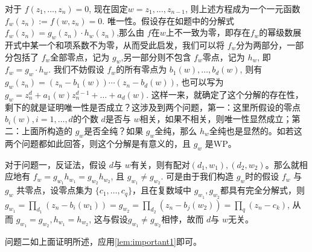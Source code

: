 \documentclass[lang=cn,12pt,fontset=none,a4paper]{beautybook}
\begin{document}
\begin{remark}
   对于 $f(z_1,\dots,z_n)=0$, 现在固定$w=z_1,\dots,z_{n-1}$, 则上述方程成为一个一元函数$f_w (z_n):=f(w,z_n)=0$. 唯一性。假设存在如题中的分解式 $f_w(z_n)=g_w(z_n)\cdot h_w(z_n)$,那么由 $f$在$w$上不一致为零，即存在$f_w$的幂级数展开式中某一个和项系数不为零，从而受此启发，我们可以将 $f_w$分为两部分，一部分包括了 $f_w$全部零点，记为 $g_w$,另一部分则不包含 $f_w$零点，记为 $h_w$, 即 $f_w=g_w\cdot h_w$. 我们不妨假设 $f_w$的所有零点为 $b_1(w),\dots,b_d(w)$, 则有 $g_w(z_n)=(z_n-b_1(w))\cdots (z_n-b_d(w))$, 也可以写为 $g_w=z_n^d+a_1(w) z_n^{d-1}+\dots+a_d(w)$. 这样一来，就确定了这个分解的存在性，剩下的就是证明唯一性是否成立？这涉及到两个问题，第一：这里所假设的零点 $b_i(w),i=1,\dots,d$的个数 $d$是否与 $w$相关，如果不相关，则唯一性显然成立；第二：上面所构造的 $g_w$是否全纯？如果 $g_w$全纯，那么 $h_w$全纯也是显然的。如若这两个问题都如此回答，则这个分解是有意义的，且 $g_w$ 是WP。
   
   对于问题一，反证法，假设 $d$与 $w$有关，则有配对$(d_1,w_1), (d_2,w_2)$。那么就相应地有 $f_w=g_{w_1} h_{w_1}=g_{w_2}h_{w_2}$, 且 $g_{w_1}\neq g_{w_2}$.  可是由于我们构造 $g_w$时的假设 $f_w$ 与 $g_w$ 共零点，设零点集为 $\{c_1,\dots,c_q\}$，且在复数域中 $g_{w_1},g_{w_2}$都具有完全分解式，则 $g_{w_1}=\prod_{d_1}(z_n-b_i(w_1))= g_{w_2}=\prod_{d_2}(z_n-b_j(w_2))=\prod_{q}(z_n-c_k)$, 从而 $g_{w_1}=g_{w_2}, h_{w_1}=h_{w_2}$, 这与假设$g_{w_1}\neq g_{w_2}$相悖，故而 $d$与 $w$无关。
   
   问题二如上面证明所述，应用\autoref{lem:important1}即可。
\end{remark}
\end{document}

